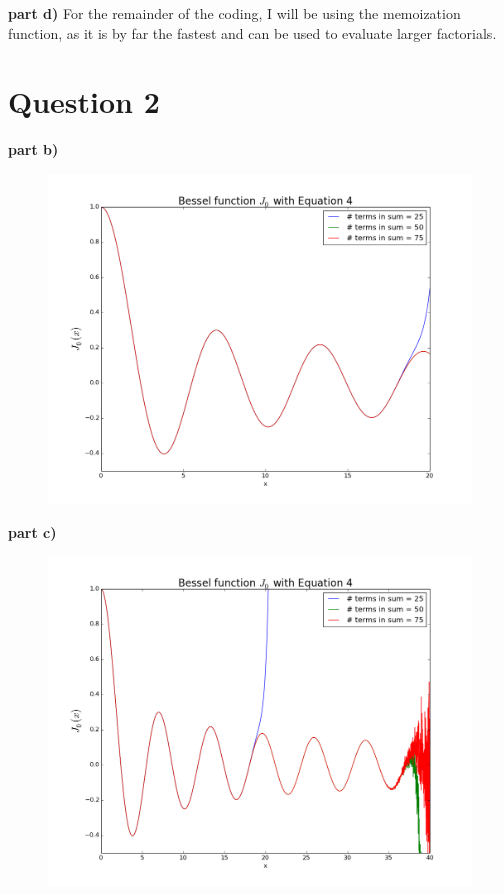 \documentclass[a4paper,12pt]{article}
\begin{document}
\textbf{part d)} For the remainder of the coding, I will be using the memoization function, as it is by far the fastest and can be used to evaluate larger factorials.

\section{Question 2}

\textbf{part b)}

\begin{figure}[H]
\centering
\includegraphics[width = \linewidth]{indepq2b.png}
\caption{}
\label{fig:q2b}
\end{figure}

\textbf{part c)}

\begin{figure}[H]
\centering
\includegraphics[width = \linewidth]{indepq2c.png}
\caption{}
\label{fig:q2c}
\end{figure}
\end{document}
